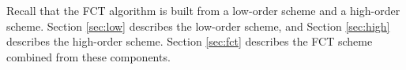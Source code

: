 Recall that the FCT algorithm is built from a low-order scheme and a high-order
scheme. Section \ref{sec:low} describes the low-order scheme, and Section
\ref{sec:high} describes the high-order scheme. Section \ref{sec:fct}
describes the FCT scheme combined from these components.
